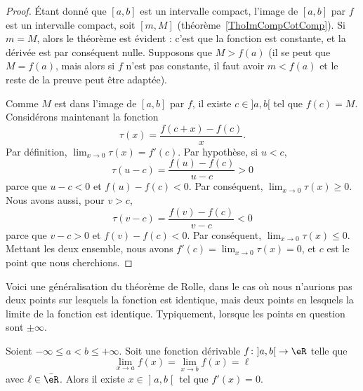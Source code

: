 \begin{proof}
    Étant donné que $[a,b]$ est un intervalle compact, l'image de $[a,b]$ par $f$ est un intervalle compact, soit $[m,M]$ (théorème~\ref{ThoImCompCotComp}). Si $m=M$, alors le théorème est évident : c'est que la fonction est constante, et la dérivée est par conséquent nulle. Supposons que $M> f(a)$ (il se peut que $M=f(a)$, mais alors si $f$ n'est pas constante, il faut avoir $m<f(a)$ et le reste de la preuve peut être adaptée).

    Comme $M$ est dans l'image de $[a,b]$ par $f$, il existe $c\in ]a,b[$ tel que $f(c)=M$. Considérons maintenant la fonction
    \begin{equation}
        \tau(x) =\frac{ f(c+x)-f(c) }{ x }.
    \end{equation}
    Par définition, $\lim_{x\to 0}\tau(x)=f'(c)$. Par hypothèse, si $u<c$,
    \begin{equation}
        \tau(u-c) = \frac{ f(u)-f(c) }{ u-c }>0
    \end{equation}
    parce que $u-c<0$ et $f(u)-f(c)<0$. Par conséquent, $\lim_{x\to 0}\tau(x)\geq 0$. Nous avons aussi, pour $v>c$,
    \begin{equation}
        \tau(v-c) = \frac{ f(v)-f(c) }{ v-c }<0
    \end{equation}
    parce que $v-c>0$ et $f(v)-f(c)<0$. Par conséquent, $\lim_{x\to 0}\tau(x)\leq 0$. Mettant les deux ensemble, nous avons $f'(c)=\lim_{x\to 0}\tau(x)=0$, et $c$ est le point que nous cherchions.
\end{proof}

Voici une généralisation du théorème de Rolle, dans le cas où nous n'aurions pas deux points sur lesquels la fonction est identique, mais deux points en lesquels la limite de la fonction est identique. Typiquement, lorsque les points en question sont \( \pm\infty\).
\begin{theorem}           \label{THOooXDTBooFeSZoK}
    Soient \( -\infty\leq a<b\leq +\infty\). Soit une fonction dérivable \( f\colon \mathopen] a , b \mathclose[\to \eR\) telle que
    \begin{equation}
        \lim_{x\to a} f(x)=\lim_{x\to b} f(x)=\ell
    \end{equation}
    avec \( \ell\in \bar \eR\). Alors il existe \( x\in \mathopen] a , b \mathclose[\) tel que \( f'(x)=0\).
\end{theorem}


